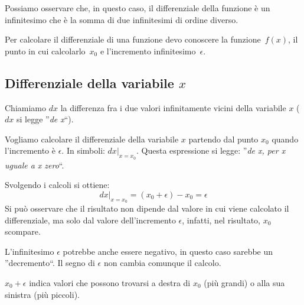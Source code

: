 Possiamo osservare che, in questo caso, il differenziale della funzione è 
un infinitesimo che è la somma di due infinitesimi di ordine diverso.

Per calcolare il differenziale di una funzione devo 
conoscere la funzione~\(f(x)\), 
il punto in cui calcolarlo~\(x_0\) e 
l'incremento infinitesimo~\(\epsilon\).

\subsection{Differenziale della variabile $x$}
\label{subsec:diff01_diffx}

Chiamiamo \(dx\) la differenza fra i due valori 
infinitamente vicini della variabile \(x\) (\(dx\) si legge 
''\emph{de x}``).

Vogliamo calcolare il differenziale della variabile \(x\) partendo dal 
punto \(x_0\) quando l'incremento è \(\epsilon\). In simboli: 
$dx|_{x=x_0}$. 
Questa espressione si legge: ''\emph{de x, per x uguale a x zero}``.

Svolgendo i calcoli si ottiene:
\[dx|_{x=x_0}=(x_0+\epsilon)-x_0=\epsilon\]
Si può osservare che il risultato non dipende dal valore in cui viene 
calcolato il differenziale, ma solo dal valore dell'incremento \(\epsilon\),
infatti, nel risultato, \(x_0\) scompare.

\begin{osservazione}
 L'infinitesimo $\epsilon$ potrebbe anche essere negativo, in questo caso 
sarebbe un ''decremento``. 
Il segno di \(\epsilon\) non cambia comunque il calcolo.

\(x_0 + \epsilon\) indica valori che possono trovarsi a destra di \(x_0\) 
(più grandi) o alla sua sinistra (più piccoli).
\end{osservazione}

